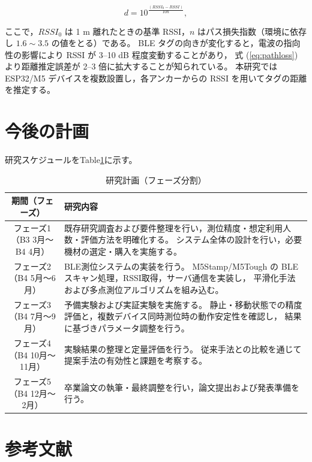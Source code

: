 \documentclass[a4paper,11pt,twocolumn]{article}
\begin{document}
\begin{equation}
d = 10^{\frac{(RSSI_{0} - RSSI)}{10n}},
\label{eq:pathloss}
\end{equation}

ここで，$RSSI_0$ は 1 m 離れたときの基準 RSSI，$n$ はパス損失指数（環境に依存し $1.6 \sim 3.5$ の値をとる）である。
BLE タグの向きが変化すると，電波の指向性の影響により RSSI が 3--10 dB 程度変動することがあり，
式 (\ref{eq:pathloss}) より距離推定誤差が 2--3 倍に拡大することが知られている。
本研究では ESP32/M5 デバイスを複数設置し，各アンカーからの RSSI を用いてタグの距離を推定する。

\section{今後の計画}
研究スケジュールをTable\ref{tab:schedule_phase}に示す。

\vspace{-0.8em}
\begin{table}[H]
\centering
\caption{研究計画（フェーズ分割）}
\label{tab:schedule_phase}
\small
\scriptsize
\setlength{\tabcolsep}{3pt}
\begin{tabular}{|c|p{5.6cm}|}
\hline
期間（フェーズ） & 研究内容 \\ \hline
フェーズ1（B3 3月〜B4 4月） &
既存研究調査および要件整理を行い，測位精度・想定利用人数・評価方法を明確化する。
システム全体の設計を行い，必要機材の選定・購入を実施する。 \\ \hline
フェーズ2（B4 5月〜6月） &
BLE測位システムの実装を行う。
M5Stamp/M5Tough の BLE スキャン処理，RSSI取得，サーバ通信を実装し，
平滑化手法および多点測位アルゴリズムを組み込む。 \\ \hline
フェーズ3（B4 7月〜9月） &
予備実験および実証実験を実施する。
静止・移動状態での精度評価と，複数デバイス同時測位時の動作安定性を確認し，
結果に基づきパラメータ調整を行う。 \\ \hline
フェーズ4（B4 10月〜11月） &
実験結果の整理と定量評価を行う。
従来手法との比較を通じて提案手法の有効性と課題を考察する。 \\ \hline
フェーズ5（B4 12月〜2月） &
卒業論文の執筆・最終調整を行い，論文提出および発表準備を行う。 \\ \hline
\end{tabular}
\end{table}

\vspace{-1.0em}
\section{参考文献}


\end{document}
